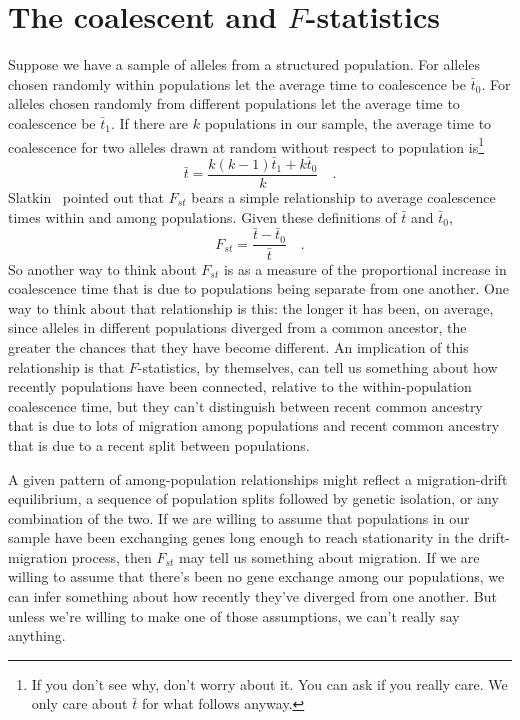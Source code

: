 \section*{The coalescent and $F$-statistics}

Suppose we have a sample of alleles from a structured population. For
alleles chosen randomly within populations let the average time to
coalescence be $\bar t_0$. For alleles chosen randomly from different
populations let the average time to coalescence be $\bar t_1$. If
there are $k$ populations in our sample, the average time to
coalescence for two alleles drawn at random without respect to
population is\footnote{If you don't see why, don't worry about it. You
can ask if you really care. We only care about $\bar t$ for what
follows anyway.}
\[
\bar t = \frac{k(k-1)\bar t_1 + k\bar t_0}
              {k} \quad .
\]
Slatkin~\cite{Slatkin-1991} pointed out that $F_{st}$ bears a simple
relationship to average coalescence times within and among
populations. Given these definitions of $\bar t$ and $\bar t_0$,
\[
F_{st} = \frac{\bar t - \bar t_0}{\bar t} \quad .
\]
So another way to think about $F_{st}$ is as a measure of the
proportional increase in coalescence time that is due to populations
being separate from one another. One way to think about that
relationship is this: the longer it has been, on average, since
alleles in different populations diverged from a common ancestor, the
greater the chances that they have become different. An implication of
this relationship is that $F$-statistics, by themselves, can tell us
something about how recently populations have been connected, relative
to the within-population coalescence time, but they can't distinguish
between recent common ancestry that is due to lots of migration among
populations and recent common ancestry that is due to a recent split
between populations.

A given pattern of among-population relationships might reflect a
migration-drift equilibrium, a sequence of population splits followed
by genetic isolation, or any combination of the two. If we are willing
to assume that populations in our sample have been exchanging genes
long enough to reach stationarity in the drift-migration process, then
$F_{st}$ may tell us something about migration. If we are willing to
assume that there's been no gene exchange among our populations, we
can infer something about how recently they've diverged from one
another. But unless we're willing to make one of those assumptions, we
can't really say anything.

